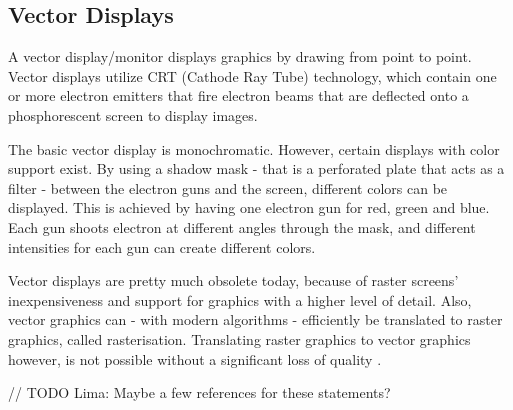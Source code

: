 \subsection{Vector Displays}
A vector display/monitor displays graphics by drawing from point to point.
Vector displays utilize CRT (Cathode Ray Tube) technology, which contain one or more electron emitters that fire electron beams that are deflected onto a phosphorescent screen to display images.

The basic vector display is monochromatic.
However, certain displays with color support exist.
By using a shadow mask - that is a perforated plate that acts as a filter - between the electron guns and the screen, different colors can be displayed. This is achieved by having one electron gun for red, green and blue. Each gun shoots electron at different angles through the mask, and different intensities for each gun can create different colors.

Vector displays are pretty much obsolete today, because of raster screens' inexpensiveness and support for graphics with a higher level of detail.
Also, vector graphics can - with modern algorithms - efficiently be translated to raster graphics, called rasterisation.
Translating raster graphics to vector graphics however, is not possible without a significant loss of quality \cite{inverse-rasterisation}.

// TODO Lima: Maybe a few references for these statements?
